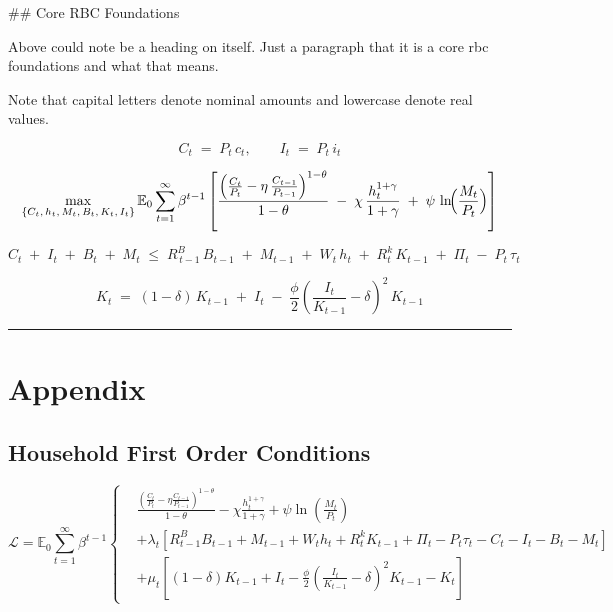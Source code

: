 \documentclass[11pt,preprint]{elsarticle}
\numberwithin{equation}{section}
\numberwithin{figure}{section}
\numberwithin{table}{section}
\begin{document}
\#\# Core RBC Foundations

Above could note be a heading on itself. Just a paragraph that it is a
core rbc foundations and what that means.

Note that capital letters denote nominal amounts and lowercase denote
real values.

\begin{equation}
C_t \;=\; P_t \, c_t,
\qquad
I_t \;=\; P_t \, i_t
\label{nominal_definitions}
\end{equation}

\begin{equation}
\max_{\{C_t,\,h_t,\,M_t,\,B_t,\,K_t,\,I_t\}}
\mathbb{E}_0 \sum_{t=1}^{\infty} \beta^{t-1}
\left[
\frac{\Bigl(\frac{C_t}{P_t} - \eta\,\frac{C_{t-1}}{P_{t-1}}\Bigr)^{1-\theta}}{1-\theta}
\;-\;\chi\,\frac{h_t^{1+\gamma}}{1+\gamma}
\;+\;\psi\,\ln\!\Bigl(\frac{M_t}{P_t}\Bigr)
\right]
\label{lifetime_utility_nominal}
\end{equation}

\begin{equation}
C_t \;+\; I_t \;+\; B_t \;+\; M_t
\;\le\;
R^B_{\,t-1}\,B_{t-1}
\;+\; M_{t-1}
\;+\; W_t\,h_t
\;+\; R^k_t\,K_{t-1}
\;+\; \Pi_t
\;-\; P_t\,\tau_t
\label{flow_constraint_nominal}
\end{equation}

\begin{equation}
K_t
\;=\;
(1 - \delta)\,K_{t-1}
\;+\; I_t
\;-\;\frac{\phi}{2}
\left(\frac{I_t}{K_{t-1}} - \delta\right)^{2}
\,K_{t-1}
\label{capital_accumulation_nominal}
\end{equation}

\begin{center}\rule{0.5\linewidth}{0.5pt}\end{center}

\section{Appendix}\label{appendix}

\subsection{Household First Order
Conditions}\label{household-first-order-conditions}

\begin{equation}
\mathcal{L} = \mathbb{E}_0 \sum_{t=1}^{\infty} \beta^{t-1} 
\left\{
\begin{aligned}
& \frac{\left( \frac{C_t}{P_t} - \eta \frac{C_{t-1}}{P_{t-1}} \right)^{1-\theta}}{1-\theta} 
- \chi \frac{h_t^{1+\gamma}}{1+\gamma} 
+ \psi \ln \left( \frac{M_t}{P_t} \right) \\
& + \lambda_t \left[ R^B_{t-1} B_{t-1} + M_{t-1} + W_t h_t + R^k_t K_{t-1} + \Pi_t - P_t \tau_t - C_t - I_t - B_t - M_t \right] \\
& + \mu_t \left[ (1 - \delta) K_{t-1} + I_t - \frac{\phi}{2} \left( \frac{I_t}{K_{t-1}} - \delta \right)^2 K_{t-1} - K_t \right]
\end{aligned}
\right.
\end{equation}
\end{document}
